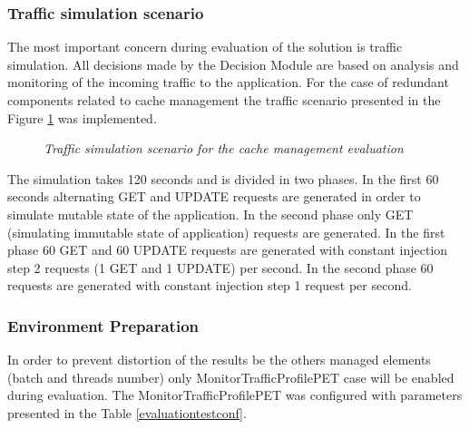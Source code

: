 \documentclass[10pt,a4paper]{article}
\begin{document}
\subsubsection{Traffic simulation scenario} \label{trafficcachesim}

The most important concern during evaluation of the solution is traffic simulation. All decisions made by the Decision Module are based on analysis and monitoring of the incoming traffic to the application. For the case of redundant components related to cache management the traffic scenario presented in the Figure \ref{trafficcache} was implemented.

\begin{figure}[!htb]
\caption{\textit{Traffic simulation scenario for the cache management evaluation}} \label{trafficcache}
\end{figure}

The simulation takes 120 seconds and is divided in two phases. In the first 60 seconds alternating GET and UPDATE requests are generated in order to simulate mutable state of the application. In the second phase only GET (simulating immutable state of application) requests are generated. In the first phase 60 GET and 60 UPDATE requests are generated with constant injection step 2 requests (1 GET and 1 UPDATE) per second. In the second phase 60 requests are generated with constant injection step 1 request per second.  

\subsubsection{Environment Preparation} 

In order to prevent distortion of the results be the others managed elements (batch and threads number) only MonitorTrafficProfilePET case will be enabled during evaluation. The MonitorTrafficProfilePET was configured with parameters presented in the Table \ref{evaluationtestconf}.
\end{document}
